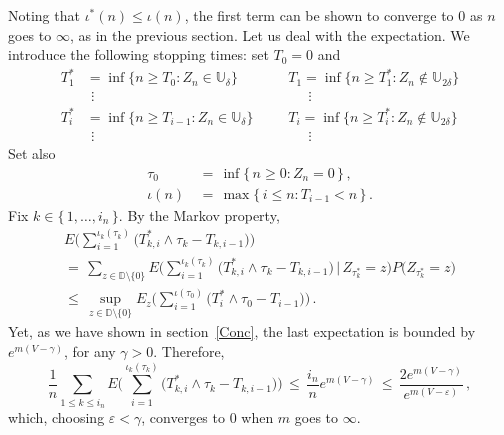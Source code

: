 \documentclass[a4paper,12pt]{article}
\theoremstyle{definition}
\theoremstyle{remark}
\def \g {\gamma}
\def \d {\delta}
\def \e {\varepsilon}
\def \dD {\mathbb{D}}
\def \dU {\mathbb{U}}
\begin{document}
Noting that $\iota^*(n)\leq \iota(n)$, the first term can be shown to converge to $0$
as $n$ goes to $\infty$, as in the previous section.
Let us deal with the expectation.
We introduce the following stopping times: set $T_0=0$ and
\begin{align*}
T^*_{1}&=\inf\big\lbrace
n\geq T_{0}:
Z_n\in\dU_\d
\big\rbrace\qquad
&&T_{1}=\inf\big\lbrace
n\geq T^*_{1}:
Z_n\not\in\dU_{2\d}
\big\rbrace\\
&\ \, \vdots &&\ \ \quad\vdots\\
T^*_{i}&=\inf\big\lbrace
n\geq T_{i-1}:
Z_n\in\dU_\d
\big\rbrace\ 
&&T_{i}=\inf\big\lbrace
n\geq T^*_{i}:
Z_n\not\in\dU_{2\d}
\big\rbrace\\
&\ \, \vdots &&\ \ \quad\vdots
\end{align*}
Set also
\begin{align*}
\tau_0\,&=\,\inf\big\lbrace\,
n\geq0 : Z_n=0
\,\big\rbrace\,,\\
\iota(n)\,&=\,\max\big\lbrace\,
i\leq n: T_{i-1}< n
\,\big\rbrace\,.
\end{align*}
Fix $k\in\lbrace\,1,\dots,i_n\,\rbrace$.
By the Markov property,
\begin{multline*}
E\Bigg(
\sum_{i=1}^{\iota_k(\tau_k)}\big(
T^*_{k,i}\wedge \tau_k-T_{k,i-1}
\big)
\Bigg)\\
=\,\sum_{z\in\dD\setminus\lbrace 0\rbrace}
E\Bigg(
\sum_{i=1}^{\iota_k(\tau_k)}\big(
T^*_{k,i}\wedge \tau_k-T_{k,i-1}
\big)\,\Bigg|\,Z_{\tau_k^*}=z
\Bigg)P\big(
Z_{\tau_k^*}=z
\big)
\\
\leq\,\sup_{z\in\dD\setminus\lbrace 0\rbrace}
E_z\Bigg(
\sum_{i=1}^{\iota(\tau_0)}\big(
T^*_{i}\wedge \tau_0-T_{i-1}
\big)
\Bigg)\,.
\end{multline*}
Yet, as we have shown in section~\ref{Conc}, the last expectation is bounded by $e^{m(V-\g)}$,
for any $\g>0$.
Therefore,
$$\frac{1}{n}\sum_{1\leq k\leq i_n}E\Bigg(
\sum_{i=1}^{\iota_k(\tau_k)}\big(
T_{k,i}^*\wedge\tau_k-T_{k,i-1}
\big)
\Bigg)\,\leq\,\frac{i_n}{n}e^{m(V-\g)}\,\leq\,
\frac{2 e^{m(V-\g)}}{e^{m(V-\e)}}\,,$$
which, choosing $\e<\g$,
converges to $0$ when $m$ goes to $\infty$.
\end{document}

